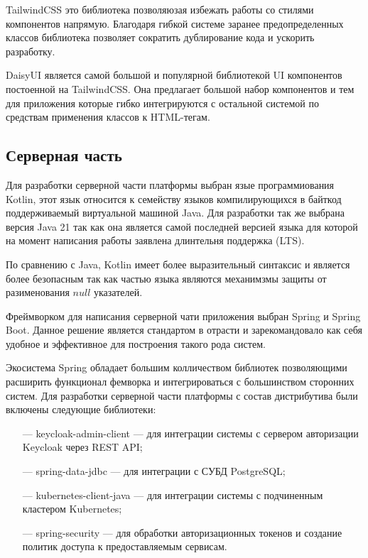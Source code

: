 TailwindCSS это библиотека позволяюзая избежать работы со стилями компонентов напрямую. Благодаря гибкой системе заранее предопределенных классов библиотека позволяет сократить дублирование кода и ускорить разработку.

DaisyUI является самой большой и популярной библиотекой UI компонентов постоенной на TailwindCSS. Она предлагает большой набор компонентов и тем для приложения которые гибко интегрируются с остальной системой по средствам применения классов к HTML-тегам.

\subsection{Серверная часть}

Для разработки серверной части платформы выбран язые программиования Kotlin, этот язык относится к семейству языков компилирующихся в байткод поддерживаемый виртуальной машиной Java. Для разработки так же выбрана версия Java 21 так как она является самой последней версией языка для которой на момент написания работы заявлена длинтельня поддержка (LTS).

По сравнению с Java, Kotlin имеет более выразительный синтаксис и является более безопасным так как частью языка являются механимзмы защиты от разименования $null$ указателей\cite{samuel2017programming}.

Фреймворком для написания серверной чати приложения выбран Spring и Spring Boot.
Данное решение является стандартом в отрасти и зарекомандовало как себя удобное и эффективное для построения такого рода систем.

Экосистема Spring обладает большим колличеством библиотек позволяющими расширить функционал фемворка и интегрироваться с большинством сторонних систем.
Для разработки серверной части платформы с состав дистрибутива были включены следующие библиотеки:

\begin{itemize}
  \item[---] keycloak-admin-client --- для интеграции системы с сервером авторизации Keycloak через REST API;
  \item[---] spring-data-jdbc --- для интеграции с СУБД PostgreSQL;
  \item[---] kubernetes-client-java --- для интеграции системы с подчиненным кластером Kubernetes;
  \item[---] spring-security --- для обработки авторизационных токенов и создание политик доступа к предоставляемым сервисам.
\end{itemize}

